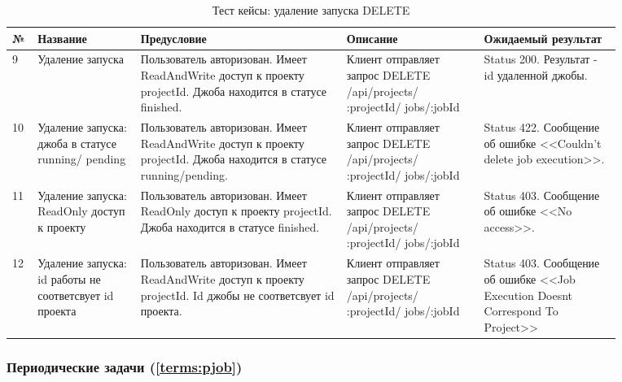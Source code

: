 \documentclass[a4paper,12pt]{article}
\begin{document}
	\begin{table}[hbt]
		\centering
		\begin{tabular}{|p{0.02\linewidth}|p{0.15\linewidth}|p{0.3\linewidth}|p{0.2\linewidth}|p{0.2\linewidth}|} 
			\hline
			\textbf{№} & \textbf{Название} & \textbf{Предусловие} & \textbf{Описание} & \textbf{Ожидаемый результат} \\ \hline
	9 & Удаление запуска & Пользователь авторизован. Имеет ReadAndWrite доступ к проекту projectId. Джоба находится в статусе finished. & Клиент отправляет запрос DELETE   /api/projects/ :projectId/ jobs/:jobId & Status 200. Результат - id удаленной джобы.  \\ \hline 
	
	10 & Удаление запуска: джоба в статусе running/ pending & Пользователь авторизован. Имеет ReadAndWrite доступ к проекту projectId. Джоба находится в статусе running/pending. & Клиент отправляет запрос DELETE   /api/projects/ :projectId/ jobs/:jobId & Status 422. Сообщение об ошибке <<Couldn't delete job execution>>. \\ \hline
	
	11 & Удаление запуска: ReadOnly доступ к проекту & Пользователь авторизован. Имеет ReadOnly доступ к проекту projectId. Джоба находится в статусе finished. & Клиент отправляет запрос DELETE   /api/projects/ :projectId/ jobs/:jobId  & Status 403. Сообщение об ошибке <<No access>>. \\ \hline
	
	12 & Удаление запуска: id работы не соответсвует id проекта & Пользователь авторизован. Имеет ReadAndWrite доступ к проекту projectId. Id джобы не соответсвует id проекта. & Клиент отправляет запрос DELETE   /api/projects/ :projectId/ jobs/:jobId & Status 403. Сообщение об ошибке <<Job Execution Doesnt Correspond To Project>> \\ \hline
	
	\end{tabular}
	\caption{Тест кейсы: удаление запуска DELETE}
	\end{table} 
	
	\clearpage
	\subsubsection{Периодические задачи (\ref{terms:pjob})}
	
\end{document}
